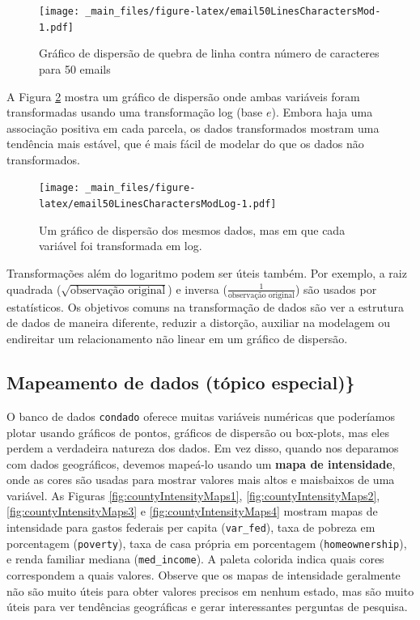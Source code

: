 \documentclass[
]{book}
\theoremstyle{definition}
\theoremstyle{definition}
\theoremstyle{definition}
\theoremstyle{definition}
\theoremstyle{remark}
\begin{document}
\begin{figure}
\centering
\texttt{[image: \_main\_files/figure-latex/email50LinesCharactersMod-1.pdf]}
\caption{\label{fig:email50LinesCharactersMod}Gráfico de dispersão de quebra de linha contra número de caracteres para 50 emails}
\end{figure}

A Figura \ref{fig:email50LinesCharactersModLog} mostra um gráfico de dispersão onde ambas variáveis foram transformadas usando uma transformação log (base \(e\)). Embora haja uma associação positiva em cada parcela, os dados transformados mostram uma tendência mais estável, que é mais fácil de modelar do que os dados não transformados.

\begin{figure}
\centering
\texttt{[image: \_main\_files/figure-latex/email50LinesCharactersModLog-1.pdf]}
\caption{\label{fig:email50LinesCharactersModLog}Um gráfico de dispersão dos mesmos dados, mas em que cada variável foi transformada em log.}
\end{figure}

Transformações além do logaritmo podem ser úteis também. Por exemplo, a raiz quadrada (\(\sqrt{\text{observação original}}\)) e inversa (\(\frac{1}{\text{observação original}}\)) são usados por estatísticos. Os objetivos comuns na transformação de dados são ver a estrutura de dados de maneira diferente, reduzir a distorção, auxiliar na modelagem ou endireitar um relacionamento não linear em um gráfico de dispersão.

\hypertarget{mapingDataSubsection}{%
\subsection{Mapeamento de dados (tópico especial)\}}\label{mapingDataSubsection}}

O banco de dados \texttt{condado} oferece muitas variáveis numéricas que poderíamos plotar usando gráficos de pontos, gráficos de dispersão ou box-plots, mas eles perdem a verdadeira natureza dos dados. Em vez disso, quando nos deparamos com dados
geográficos, devemos mapeá-lo usando um \textbf{mapa de intensidade}, onde as cores são usadas para mostrar valores mais altos e maisbaixos de uma variável. As Figuras \ref{fig:countyIntensityMaps1}, \ref{fig:countyIntensityMaps2}, \ref{fig:countyIntensityMaps3} e \ref{fig:countyIntensityMaps4} mostram mapas de intensidade para gastos federais per capita (\texttt{var\_fed}), taxa de pobreza em porcentagem (\texttt{poverty}), taxa de casa própria em porcentagem (\texttt{homeownership}), e renda familiar mediana (\texttt{med\_income}). A paleta colorida indica quais cores correspondem a
quais valores. Observe que os mapas de intensidade geralmente não são muito úteis para obter valores precisos em nenhum estado, mas são muito úteis para ver tendências geográficas e gerar interessantes perguntas de pesquisa.
\end{document}
